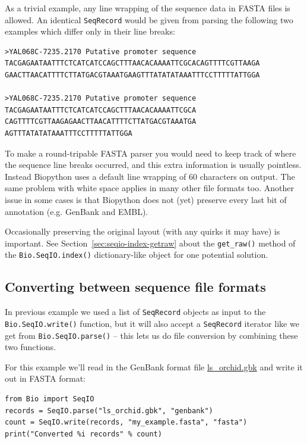 \documentclass{report}
\begin{document}
As a trivial example, any line wrapping of the sequence data in FASTA files is
allowed. An identical \verb|SeqRecord| would be given from parsing the following
two examples which differ only in their line breaks:

\begin{verbatim}
>YAL068C-7235.2170 Putative promoter sequence
TACGAGAATAATTTCTCATCATCCAGCTTTAACACAAAATTCGCACAGTTTTCGTTAAGA
GAACTTAACATTTTCTTATGACGTAAATGAAGTTTATATATAAATTTCCTTTTTATTGGA

>YAL068C-7235.2170 Putative promoter sequence
TACGAGAATAATTTCTCATCATCCAGCTTTAACACAAAATTCGCA
CAGTTTTCGTTAAGAGAACTTAACATTTTCTTATGACGTAAATGA
AGTTTATATATAAATTTCCTTTTTATTGGA
\end{verbatim}

To make a round-tripable FASTA parser you would need to keep track of where the
sequence line breaks occurred, and this extra information is usually pointless.
Instead Biopython uses a default line wrapping of $60$ characters on output.
The same problem with white space applies in many other file formats too.
Another issue in some cases is that Biopython does not (yet) preserve every
last bit of annotation (e.g. GenBank and EMBL).

Occasionally preserving the original layout (with any quirks it may have) is
important. See Section~\ref{sec:seqio-index-getraw} about the \verb|get_raw()|
method of the \verb|Bio.SeqIO.index()| dictionary-like object for one potential
solution.

\subsection{Converting between sequence file formats}
\label{sec:SeqIO-conversion}

In previous example we used a list of \verb|SeqRecord| objects as input to the \verb|Bio.SeqIO.write()| function, but it will also accept a \verb|SeqRecord| iterator like we get from \verb|Bio.SeqIO.parse()| -- this lets us do file conversion by combining these two functions.

For this example we'll read in the GenBank format file \href{http://biopython.org/DIST/docs/tutorial/examples/ls_orchid.gbk}{ls\_orchid.gbk} and write it out in FASTA format:

\begin{verbatim}
from Bio import SeqIO
records = SeqIO.parse("ls_orchid.gbk", "genbank")
count = SeqIO.write(records, "my_example.fasta", "fasta")
print("Converted %i records" % count)
\end{verbatim}
\end{document}
